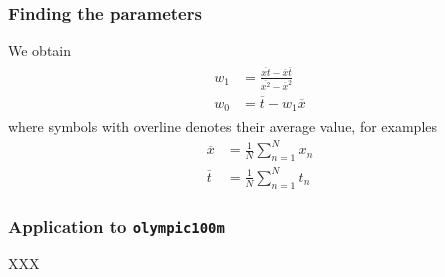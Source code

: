 \documentclass[english,10pt,aspectratio=169,fleqn]{beamer}
\begin{document}
\begin{frame} %
\frametitle{Finding the parameters}

We obtain
\begin{align*}
\begin{split}
w_{1} & = \frac{\overline{xt} - \overline{x}\overline{t}}{\overline{x^2} - \overline{x}^2} \\
w_{0} & = \overline{t} - w_{1} \overline{x}
\end{split}
\label{eq:w0_w1_simple}
\end{align*}
where symbols with overline denotes their average value, for examples
\begin{align*}
\overline{x} & = \frac{1}{N} \sum_{n=1}^{N} x_{n} \\
\overline{t} & = \frac{1}{N} \sum_{n=1}^{N} t_{n}
\end{align*}

\end{frame} %


\begin{frame} %
\frametitle{Application to {\tt olympic100m}}

XXX

\end{frame} %
\end{document}
